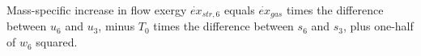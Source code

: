 Mass-specific increase in flow exergy \( \dot{ex}_{str,6} \) equals \( \dot{ex}_{gas} \) times the difference between \( u_6 \) and \( u_3 \), minus \( T_0 \) times the difference between \( s_6 \) and \( s_3 \), plus one-half of \( w_6 \) squared.